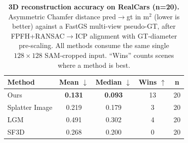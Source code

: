 \begin{table}[t]
\centering
\small
\caption{\textbf{3D reconstruction accuracy on RealCars (n=20).} Asymmetric Chamfer distance pred$\rightarrow$gt in m$^2$ (lower is better) against a FastGS multi-view pseudo-GT, after FPFH+RANSAC$\rightarrow$ICP alignment with GT-diameter pre-scaling. All methods consume the same single $128{\times}128$ SAM-cropped input. ``Wins'' counts scenes where a method is best.}
\label{tab:realcars_recon_compact}
\begin{tabular}{lcccc}
\toprule
Method & Mean $\downarrow$ & Median $\downarrow$ & Wins $\uparrow$ & n \\
\midrule
Ours & \textbf{0.131} & \textbf{0.093} & 13 & 20 \\
Splatter Image & 0.219 & 0.179 & 3 & 20 \\
LGM & 0.491 & 0.302 & 4 & 20 \\
SF3D & 0.268 & 0.200 & 0 & 20 \\
\bottomrule
\end{tabular}
\end{table}
